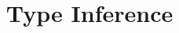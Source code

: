 \documentclass[preprint]{sigplanconf}
\begin{document}

\title{Type Inference}





% 
% 

\clearpage
\appendix


\end{document}
